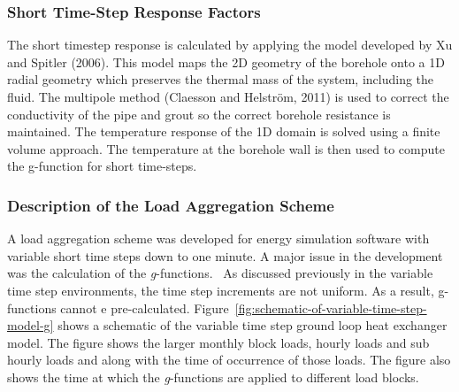 \subsubsection{Short Time-Step Response Factors}\label{short-time-step-response-factors}

The short timestep response is calculated by applying the model developed by Xu and Spitler (2006). This model maps the 2D geometry of the borehole onto a 1D radial geometry which preserves the thermal mass of the system, including the fluid. The multipole method (Claesson and Helstr{\"o}m, 2011) is used to correct the conductivity of the pipe and grout so the correct borehole resistance is maintained. The temperature response of the 1D domain is solved using a finite volume approach. The temperature at the borehole wall is then used to compute the g-function for short time-steps.

\subsubsection{Description of the Load Aggregation Scheme}\label{description-of-the-load-aggregation-scheme}

A load aggregation scheme was developed for energy simulation software with variable short time steps down to one minute. A major issue in the development was the calculation of the \emph{g}-functions.~ As discussed previously in the variable time step environments, the time step increments are not uniform. As a result, g-functions cannot e pre-calculated. Figure~\ref{fig:schematic-of-variable-time-step-model-g} shows a schematic of the variable time step ground loop heat exchanger model. The figure shows the larger monthly block loads, hourly loads and sub hourly loads and along with the time of occurrence of those loads. The figure also shows the time at which the \emph{g}-functions are applied to different load blocks.

